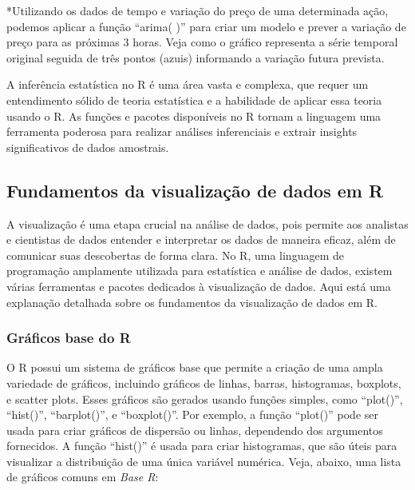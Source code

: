 \documentclass[
]{book}
\begin{document}
*Utilizando os dados de tempo e variação do preço de uma determinada ação, podemos aplicar a função ``arima( )'' para criar um modelo e prever a variação de preço para as próximas 3 horas. Veja como o gráfico representa a série temporal original seguida de três pontos (azuis) informando a variação futura prevista.

A inferência estatística no R é uma área vasta e complexa, que requer um entendimento sólido de teoria estatística e a habilidade de aplicar essa teoria usando o R. As funções e pacotes disponíveis no R tornam a linguagem uma ferramenta poderosa para realizar análises inferenciais e extrair insights significativos de dados amostrais.

\subsection{Fundamentos da visualização de dados em R}\label{fundamentos-da-visualizauxe7uxe3o-de-dados-em-r}

A visualização é uma etapa crucial na análise de dados, pois permite aos analistas e cientistas de dados entender e interpretar os dados de maneira eficaz, além de comunicar suas descobertas de forma clara. No R, uma linguagem de programação amplamente utilizada para estatística e análise de dados, existem várias ferramentas e pacotes dedicados à visualização de dados. Aqui está uma explanação detalhada sobre os fundamentos da visualização de dados em R.

\subsubsection{Gráficos base do R}\label{gruxe1ficos-base-do-r}

O R possui um sistema de gráficos base que permite a criação de uma ampla variedade de gráficos, incluindo gráficos de linhas, barras, histogramas, boxplots, e scatter plots. Esses gráficos são gerados usando funções simples, como ``plot()'', ``hist()'', ``barplot()'', e ``boxplot()''. Por exemplo, a função ``plot()'' pode ser usada para criar gráficos de dispersão ou linhas, dependendo dos argumentos fornecidos. A função ``hist()'' é usada para criar histogramas, que são úteis para visualizar a distribuição de uma única variável numérica. Veja, abaixo, uma lista de gráficos comuns em \emph{Base R}:
\end{document}
